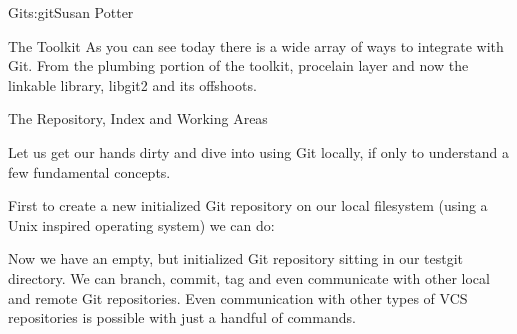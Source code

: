 \begin{aosachapter}{Git}{s:git}{Susan Potter}
\begin{aosasect1}{The Toolkit}
As you can see today there is a wide array of ways to integrate with Git.
From the plumbing portion of the toolkit, procelain layer and now the
linkable library, libgit2 and its offshoots.
\end{aosasect1}

\begin{aosasect1}{The Repository, Index and Working Areas}

Let us get our hands dirty and dive into using Git locally, if only to
understand a few fundamental concepts.

First to create a new initialized Git repository on our local filesystem
(using a Unix inspired operating system) we can do:
\begin{aosaitemize}
  \item {}
  \item {}
  \item {}
\end{aosaitemize}

Now we have an empty, but initialized Git repository sitting in our testgit
directory. We can branch, commit, tag and even communicate with other local
and remote Git repositories. Even communication with other types of VCS
repositories is possible with just a handful of  commands.


\end{aosasect1}
\end{aosachapter}
